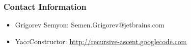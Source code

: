 \documentclass{beamer}
\begin{document}
\begin{frame}
	\transwipe[direction=90]
	\frametitle{Contact Information}
	\begin{itemize}
        \item Grigorev Semyon: Semen.Grigorev@jetbrains.com
		\item YaccConstructor: \href{http://recursive-ascent.googlecode.com}{http://recursive-ascent.googlecode.com}
	\end{itemize}
\end{frame}
\end{document}
